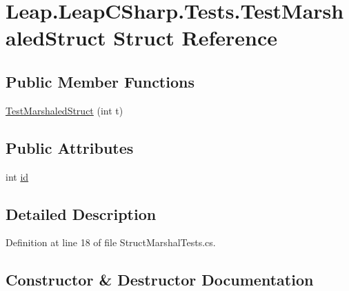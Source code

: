 \hypertarget{struct_leap_1_1_leap_c_sharp_1_1_tests_1_1_test_marshaled_struct}{}\section{Leap.\+Leap\+C\+Sharp.\+Tests.\+Test\+Marshaled\+Struct Struct Reference}
\label{struct_leap_1_1_leap_c_sharp_1_1_tests_1_1_test_marshaled_struct}
\subsection*{Public Member Functions}
\begin{DoxyCompactItemize}
\item 
\mbox{\hyperlink{struct_leap_1_1_leap_c_sharp_1_1_tests_1_1_test_marshaled_struct_ae3963be967349ef673366fe28fa59892}{Test\+Marshaled\+Struct}} (int t)
\end{DoxyCompactItemize}
\subsection*{Public Attributes}
\begin{DoxyCompactItemize}
\item 
int \mbox{\hyperlink{struct_leap_1_1_leap_c_sharp_1_1_tests_1_1_test_marshaled_struct_a46b6e7994957bd6b633533479298e2b1}{id}}
\end{DoxyCompactItemize}


\subsection{Detailed Description}


Definition at line 18 of file Struct\+Marshal\+Tests.\+cs.



\subsection{Constructor \& Destructor Documentation}
\mbox{\label{struct_leap_1_1_leap_c_sharp_1_1_tests_1_1_test_marshaled_struct_ae3963be967349ef673366fe28fa59892}} 
